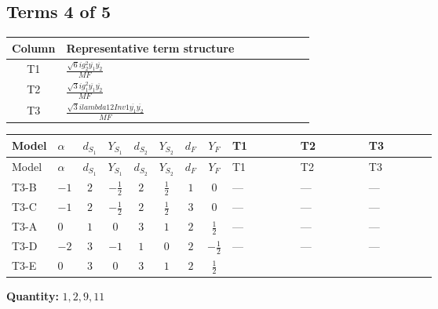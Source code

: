 \documentclass[8pt]{article}
\begin{document}
\begin{landscape}
\subsection*{Terms 4 of 5}
\begin{center}
\begin{tabular}{@{}c >{\raggedright\arraybackslash}p{0.82\linewidth}@{}}
\toprule
Column & Representative term structure \\
\midrule
T1 & \(\displaystyle \frac{\sqrt{6} i g_{2}^{2} \overline{y_{1}} \overline{y_{2}}}{MF}\) \\
\midrule
T2 & \(\displaystyle \frac{\sqrt{3} i g_{1}^{2} \overline{y_{1}} \overline{y_{2}}}{MF}\) \\
\midrule
T3 & \(\displaystyle \frac{\sqrt{3} i lambda12Inv1 \overline{y_{1}} \overline{y_{2}}}{MF}\) \\
\midrule
\bottomrule
\end{tabular}
\end{center}
\smallskip
\tiny
\begin{longtable}{@{}llcccccc >{\raggedright\arraybackslash}p{0.21\linewidth} >{\raggedright\arraybackslash}p{0.21\linewidth} >{\raggedright\arraybackslash}p{0.21\linewidth}@{}}
\toprule
Model & $\alpha$ & $d_{S_1}$ & $Y_{S_1}$ & $d_{S_2}$ & $Y_{S_2}$ & $d_F$ & $Y_F$ & T1 & T2 & T3 \\
\midrule
\endfirsthead
\toprule
Model & $\alpha$ & $d_{S_1}$ & $Y_{S_1}$ & $d_{S_2}$ & $Y_{S_2}$ & $d_F$ & $Y_F$ & T1 & T2 & T3 \\
\midrule
\endhead
T3-B & $-1$ & $2$ & $-\frac{1}{2}$ & $2$ & $\frac{1}{2}$ & $1$ & $0$ & --- & --- & --- \\
\midrule
T3-C & $-1$ & $2$ & $-\frac{1}{2}$ & $2$ & $\frac{1}{2}$ & $3$ & $0$ & --- & --- & --- \\
\midrule
T3-A & $0$ & $1$ & $0$ & $3$ & $1$ & $2$ & $\frac{1}{2}$ & --- & --- & --- \\
\midrule
T3-D & $-2$ & $3$ & $-1$ & $1$ & $0$ & $2$ & $-\frac{1}{2}$ & --- & --- & --- \\
\midrule
T3-E & $0$ & $3$ & $0$ & $3$ & $1$ & $2$ & $\frac{1}{2}$ & \scriptsize\adjustbox{max width=\linewidth}{$\begin{gathered} - \frac{\sqrt{6} i g_{2}^{2} \overline{y_{1}} \overline{y_{2}}}{6 MF}\end{gathered}$} & \scriptsize\adjustbox{max width=\linewidth}{$\begin{gathered} - \frac{\sqrt{3} i g_{1}^{2} \overline{y_{1}} \overline{y_{2}}}{8 MF}\end{gathered}$} & \scriptsize\adjustbox{max width=\linewidth}{$\begin{gathered} \frac{\sqrt{3} i lambda12Inv1 \overline{y_{1}} \overline{y_{2}}}{6 MF}\end{gathered}$} \\
\midrule
\bottomrule
\end{longtable}
\clearpage
\noindent\textbf{Quantity: }$\mathrm{1,2,9,11}$\par\smallskip

\end{landscape}
\end{document}
